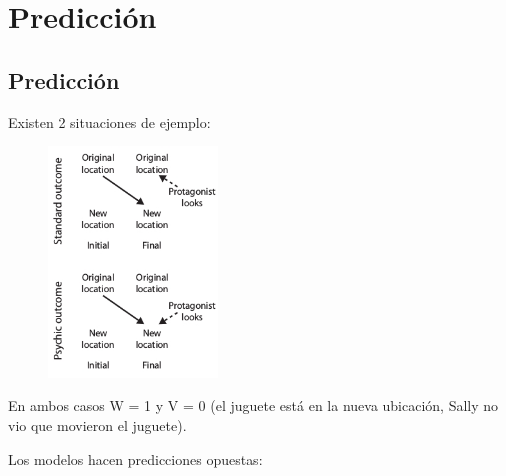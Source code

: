 \documentclass{beamer}
\begin{document}
\section{Predicción}

\subsection{Predicción}
\begin{frame}

Existen 2 situaciones de ejemplo:

\begin{figure}[h!]
  \centering
    \includegraphics[width=0.4\textwidth]{imagenes/situaciones.jpg}
\end{figure}

En ambos casos W = 1 y V = 0 (el juguete está en la nueva ubicación, Sally no vio que movieron el juguete).

\end{frame}

\begin{frame}

Los modelos hacen predicciones opuestas: 

\end{frame}
\end{document}
